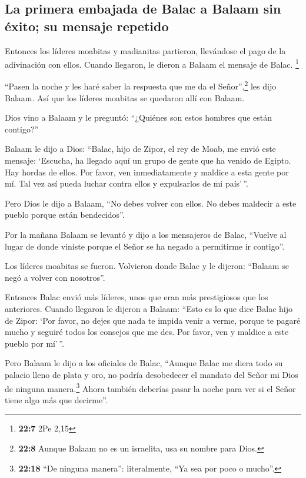\hypertarget{la-primera-embajada-de-balac-a-balaam-sin-uxe9xito-su-mensaje-repetido}{%
\subsection{La primera embajada de Balac a Balaam sin éxito; su mensaje
repetido}\label{la-primera-embajada-de-balac-a-balaam-sin-uxe9xito-su-mensaje-repetido}}

 Entonces los líderes moabitas y madianitas partieron,
llevándose el pago de la adivinación con ellos. Cuando llegaron, le
dieron a Balaam el mensaje de Balac. \footnote{\textbf{22:7} 2Pe 2,15}

 ``Pasen la noche y les haré saber la respuesta que me da
el Señor'',\footnote{\textbf{22:8} Aunque Balaam no es un israelita, usa
  su nombre para Dios.} les dijo Balaam. Así que los líderes moabitas se
quedaron allí con Balaam.

 Dios vino a Balaam y le preguntó: ``¿Quiénes son estos
hombres que están contigo?''

 Balaam le dijo a Dios: ``Balac, hijo de Zipor, el rey de
Moab, me envió este mensaje:  `Escucha, ha llegado aquí
un grupo de gente que ha venido de Egipto. Hay hordas de ellos. Por
favor, ven inmediatamente y maldice a esta gente por mí. Tal vez así
pueda luchar contra ellos y expulsarlos de mi país'\,''.

 Pero Dios le dijo a Balaam, ``No debes volver con ellos.
No debes maldecir a este pueblo porque están bendecidos''.

 Por la mañana Balaam se levantó y dijo a los mensajeros
de Balac, ``Vuelve al lugar de donde viniste porque el Señor se ha
negado a permitirme ir contigo''.

 Los líderes moabitas se fueron. Volvieron donde Balac y
le dijeron: ``Balaam se negó a volver con nosotros''.

 Entonces Balac envió más líderes, unos que eran más
prestigiosos que los anteriores.  Cuando llegaron le
dijeron a Balaam: ``Esto es lo que dice Balac hijo de Zipor: `Por favor,
no dejes que nada te impida venir a verme,  porque te
pagaré mucho y seguiré todos los consejos que me des. Por favor, ven y
maldice a este pueblo por mí'\,''.

 Pero Balaam le dijo a los oficiales de Balac, ``Aunque
Balac me diera todo su palacio lleno de plata y oro, no podría
desobedecer el mandato del Señor mi Dios de ninguna manera.\footnote{\textbf{22:18}
  ``De ninguna manera'': literalmente, ``Ya sea por poco o mucho''.}
 Ahora también deberías pasar la noche para ver si el
Señor tiene algo más que decirme''.

